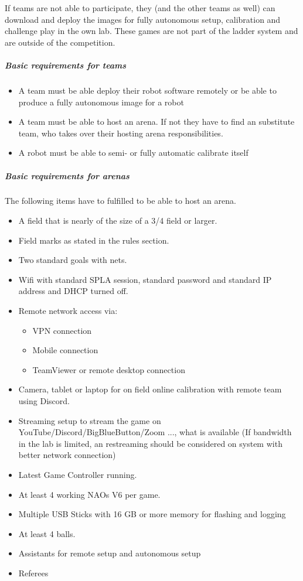 If teams are not able to participate, they (and the other teams as well) can download and deploy the images for fully autonomous setup, calibration and challenge play in the own lab. These games are not part of the ladder system and are outside of the competition.

\subparagraph*{Basic requirements for teams}

\begin{itemize}
    \item A team must be able deploy their robot software remotely or be able to produce a fully autonomous image for a robot
    \item A team must be able to host an arena. If not they have to find an substitute team, who takes over their hosting arena responsibilities.
    \item A robot must be able to semi- or fully automatic calibrate itself
\end{itemize}

\subparagraph*{Basic requirements for arenas}

The following items have to fulfilled to be able to host an arena.

\begin{itemize}
    \item A field that is nearly of the size of a 3/4 field or larger.
    \item Field marks as stated in the rules section. 
    \item Two standard goals with nets.
    \item Wifi with standard SPL\textunderscore A session, standard password and standard IP address and DHCP turned off.
    \item Remote network access via:
    \begin{itemize}
        \item VPN connection
        \item Mobile connection
        \item TeamViewer or remote desktop connection
    \end{itemize}
    \item Camera, tablet or laptop for on field online calibration with remote team using Discord.
    \item Streaming setup to stream the game on YouTube/Discord/BigBlueButton/Zoom ..., what is available (If bandwidth in the lab is limited, an restreaming should be considered on system with better network connection)
    \item Latest Game Controller running.
    \item At least 4 working NAOs V6 per game.
    \item Multiple USB Sticks with 16 GB or more memory  for flashing and logging 
    \item At least 4 balls.
    \item Assistants for remote setup and autonomous setup
    \item Referees
\end{itemize}

